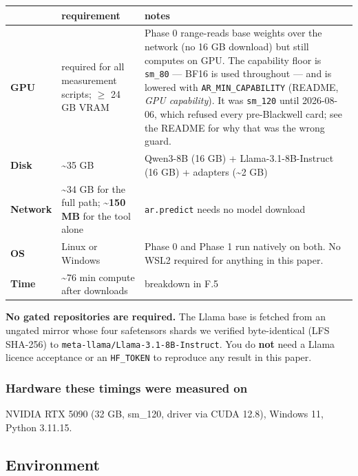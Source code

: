 \begin{table}[t]
\centering\scriptsize
\begin{tabularx}{\textwidth}{l>{\hsize=0.412\hsize\raggedright\arraybackslash}X>{\hsize=1.588\hsize\raggedright\arraybackslash}X}
\toprule
 & requirement & notes \\
\midrule
\textbf{GPU} & required for all measurement scripts; $\geq$ 24 GB VRAM & Phase 0 range-reads base weights over the network (no 16 GB download) but still computes on GPU. The capability floor is \texttt{sm\_\allowbreak{}80} --- BF16 is used throughout --- and is lowered with \texttt{AR\_\allowbreak{}MIN\_\allowbreak{}CAPABILITY} (README, \emph{GPU capability}). It was \texttt{sm\_\allowbreak{}120} until 2026-08-06, which refused every pre-Blackwell card; see the README for why that was the wrong guard. \\
\textbf{Disk} & \textasciitilde{}35 GB & Qwen3-8B (16 GB) + Llama-3.1-8B-Instruct (16 GB) + adapters (\textasciitilde{}2 GB) \\
\textbf{Network} & \textasciitilde{}34 GB for the full path; \textbf{\textasciitilde{}150 MB} for the tool alone & \texttt{ar.\allowbreak{}predict} needs no model download \\
\textbf{OS} & Linux or Windows & Phase 0 and Phase 1 run natively on both. No WSL2 required for anything in this paper. \\
\textbf{Time} & \textasciitilde{}76 min compute after downloads & breakdown in F.5 \\
\bottomrule
\end{tabularx}
\end{table}

\textbf{No gated repositories are required.} The Llama base is fetched from an ungated mirror whose four safetensors shards we verified byte-identical (LFS SHA-256) to \texttt{meta-\allowbreak{}llama/\allowbreak{}Llama-\allowbreak{}3.\allowbreak{}1-\allowbreak{}8B-\allowbreak{}Instruct}. You do \textbf{not} need a Llama licence acceptance or an \texttt{HF\_\allowbreak{}TOKEN} to reproduce any result in this paper.

\subsubsection{Hardware these timings were measured on}

NVIDIA RTX 5090 (32 GB, sm\_120, driver via CUDA 12.8), Windows 11, Python 3.11.15.

\subsection{Environment}

